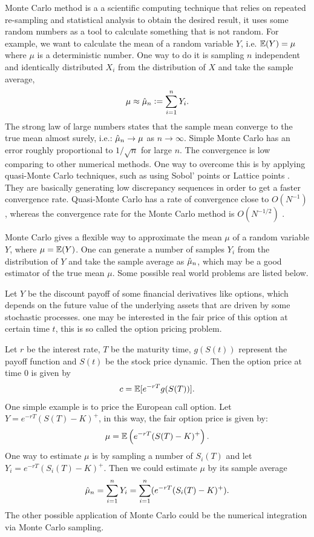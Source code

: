\documentclass{iitthesis}
\begin{document}
 Monte Carlo method is a a scientific computing technique that relies on repeated re-sampling and statistical analysis to obtain the desired result, it uses some random numbers as a tool to calculate something that is not random. For example, we want to calculate the mean of a random variable $Y$, i.e. $\mathbb{E}(Y) = \mu$ where $\mu$ is a deterministic number.  One way to do it is sampling $n$ independent and identically distributed $X_i$ from the distribution of $X$ and take the sample average, 
$$\mu \approx \hat{\mu}_n := \sum_{i=1}^nY_i.$$
The strong law of large numbers states that the sample mean converge to the true mean almost surely, i.e.: $\hat{\mu}_n \to \mu$ as $n \to \infty$. Simple Monte Carlo has an error roughly proportional to $1/\sqrt{n}$ for large $n$. The convergence is low comparing to other numerical methods. One way to overcome this is by applying quasi-Monte Carlo techniques, such as using Sobol' points \cite{Sobol67, Sobol76}or Lattice points \cite{Glasserman03}. They are basically generating low discrepancy sequences in order to get a faster convergence rate. Quasi-Monte Carlo has a rate of convergence close to $O(N^{-1})$ \cite{Glasserman03}, whereas the convergence rate for the Monte Carlo method is $O(N^{-1/2})$ \cite{Glasserman03}.

Monte Carlo gives a flexible way to approximate the mean $\mu$ of a random variable $Y$, where $\mu=\mathbb{E}(Y)$. One can generate a number of samples $Y_i$ from the distribution of $Y$ and take the sample average as $\hat{\mu}_n$, which may be a good estimator of the true mean $\mu$. Some possible real world problems are listed below. 

Let $Y$ be the discount payoff of some financial derivatives like options, which depends on the future value of the underlying assets that are driven by some stochastic processes. one may be interested in the fair price of this option at certain time $t$, this is so called the option pricing problem. 

Let $r$ be the interest rate, $T$ be the maturity time, $g(S(t))$ represent the payoff function and $S(t)$ be the stock price dynamic. Then the option price at time $0$ is given by $$c=\mathbb{E}[e^{-rT}g(S(T))].$$ One simple example is to price the European call option. Let $Y = e^{-rT}(S(T)-K)^+ $, in this way, the fair option price is given by:
$$\mu = \mathbb{E}\left(e^{-rT}(S(T)-K)^+\right).$$
One way to estimate $\mu$ is by sampling a number of $S_i(T)$ and let $Y_i = e^{-rT}(S_i(T)-K)^+$. Then we could estimate $\mu$ by its sample average
$$\hat{\mu}_n = \sum_{i=1}^n Y_i = \sum_{i=1}^n( e^{-rT}(S_i(T)-K)^+).$$
The other possible application of Monte Carlo could be the numerical integration via Monte Carlo sampling.
\end{document}
